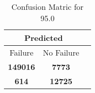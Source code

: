 \begin{table}[] 
\caption{Confusion Matric for 95.0} 
\label{Table: Prediction Accuracy-None95.0SVMEKF-ignoreReflection-Reflection} 
\centering 
\begin{tabular} 
 {@{}ccc@{}} 
\toprule 
\multicolumn{2}{c}{\textbf{Predicted}}
 \\ \midrule 
\multicolumn{1}{|c|}{Failure} & 
\multicolumn{1}{c|}{No Failure}
 \\ \midrule 
\multicolumn{1}{|c|}{\color{green}\textbf{149016}} & 
\multicolumn{1}{c|}{\color{red}\textbf{7773}}
 \\ \midrule 
\multicolumn{1}{|c|}{\color{red}\textbf{614}} & 
\multicolumn{1}{c|}{\color{green}\textbf{12725}}
 \\ \bottomrule 
\end{tabular} 
\end{table} 
